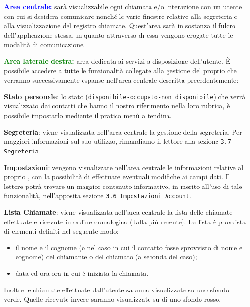 \begin{description}
\item \textcolor{blue}{\textbf{Area centrale:}} sarà visualizzabile ogni chiamata e/o interazione con un utente con cui si desidera comunicare nonché le varie finestre relative alla segreteria e alla visualizzazione del registro chiamate. Quest'area sarà in sostanza il fulcro dell'applicazione stessa, in quanto attraverso di essa vengono erogate tutte le modalità di comunicazione.

\item \textcolor{green}{\textbf{Area laterale destra:}} area dedicata ai servizi a disposizione dell'utente. È possibile accedere a tutte le funzionalità collegate alla gestione del proprio  che verranno successivamente espanse nell'area centrale descritta precedentemente:
\begin{description}
\item \textbf{Stato personale}: lo stato (\texttt{disponibile-occupato-non disponibile}) che verrà visualizzato dai contatti che hanno il nostro riferimento nella loro rubrica, è possibile impostarlo mediante il pratico menù a tendina.
\item \textbf{Segreteria}: viene visualizzata nell'area centrale la gestione della segreteria. Per maggiori informazioni sul suo utilizzo, rimandiamo il lettore alla sezione \texttt{3.7 Segreteria}.
\item \textbf{Impostazioni}: vengono visualizzate nell'area centrale le informazioni relative al 
proprio , con la possibilità di effettuare eventuali modifiche ai campi dati. Il lettore potrà trovare un maggior contenuto informativo, in merito all'uso di tale funzionalità, nell'apposita sezione \texttt{3.6 Impostazioni Account}.
\item \textbf{Lista Chiamate}: viene visualizzata nell'area centrale la lista delle chiamate effettuate e ricevute in ordine cronologico (dalla più recente). La lista è provvista di elementi definiti nel seguente modo:
	\begin{itemize}
		\item il nome e il cognome (o  nel caso in cui il contatto fosse sprovvisto di nome e cognome) del chiamante o del chiamato (a seconda del caso);
		\item data ed ora ora in cui è iniziata la chiamata.
	\end{itemize}
	Inoltre le chiamate effettuate dall'utente saranno visualizzate su uno sfondo verde. Quelle ricevute invece saranno visualizzate su di uno sfondo rosso.

\end{description}
\end{description}
